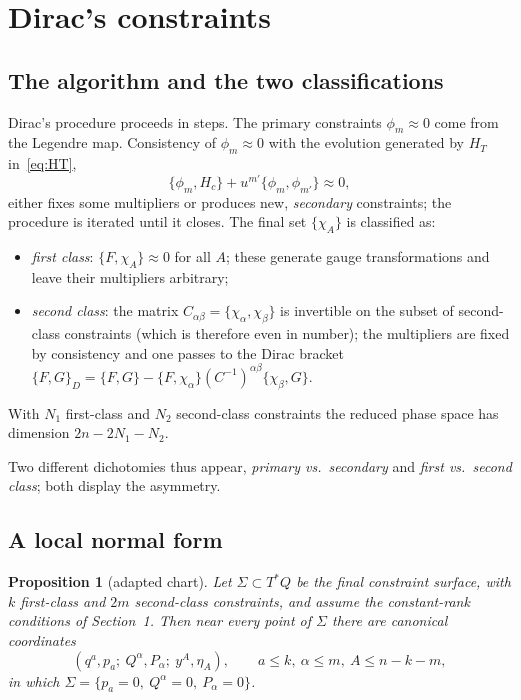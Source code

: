 \documentclass[11pt,a4paper]{article}
\newtheorem{proposition}[theorem]{Proposition}
\theoremstyle{definition}
\theoremstyle{remark}
\newcommand{\PB}[2]{\{#1,#2\}}
\newcommand{\weq}{\approx}
\begin{document}
\section{Dirac's constraints}

\subsection{The algorithm and the two classifications}

Dirac's procedure \cite{dirac50,dirac64} proceeds in steps. The primary constraints $\phi_m\weq0$ come from the Legendre map. Consistency of $\phi_m\weq0$ with the evolution generated by $H_T$ in~\eqref{eq:HT},
\[
\{\phi_m,H_c\}+u^{m'}\{\phi_m,\phi_{m'}\}\weq0 ,
\]
either fixes some multipliers or produces new, \emph{secondary} constraints; the procedure is iterated until it closes. The final set $\{\chi_A\}$ is classified as:
\begin{itemize}
\item \emph{first class}: $\PB{F}{\chi_A}\weq0$ for all $A$; these generate gauge transformations and leave their multipliers arbitrary;
\item \emph{second class}: the matrix $C_{\alpha\beta}=\PB{\chi_\alpha}{\chi_\beta}$ is invertible on the subset of second-class constraints (which is therefore even in number); the multipliers are fixed by consistency and one passes to the Dirac bracket $\PB FG_D=\PB FG-\PB F{\chi_\alpha}(C^{-1})^{\alpha\beta}\PB{\chi_\beta}G$.
\end{itemize}
With $N_1$ first-class and $N_2$ second-class constraints the reduced phase space has dimension $2n-2N_1-N_2$.

Two different dichotomies thus appear, \emph{primary vs.\ secondary} and \emph{first vs.\ second class}; both display the asymmetry.

\subsection{A local normal form}

\begin{proposition}[adapted chart]\label{prop:normal}
Let $\Sigma\subset T^*Q$ be the final constraint surface, with $k$ first-class and $2m$ second-class constraints, and assume the constant-rank conditions of Section~1. Then near every point of $\Sigma$ there are canonical coordinates
\[
(q^a,p_a;\ Q^\alpha,P_\alpha;\ y^A,\eta_A),\qquad a\le k,\ \alpha\le m,\ A\le n-k-m,
\]
in which $\Sigma=\{p_a=0,\ Q^\alpha=0,\ P_\alpha=0\}$.
\end{proposition}
\end{document}
